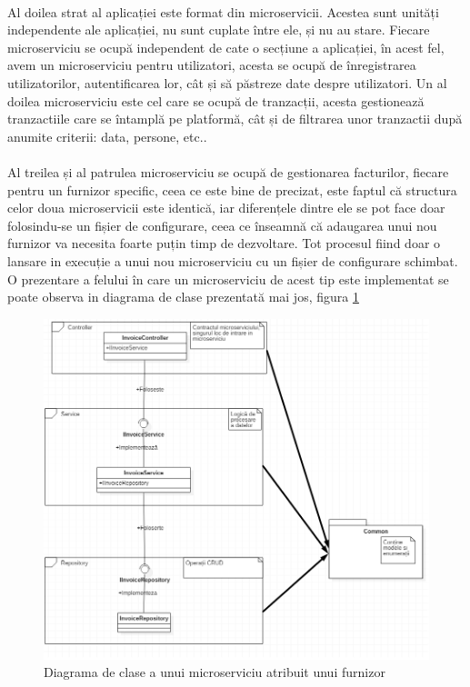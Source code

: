 \documentclass[12pt]{report}
\begin{document}
	\paragraph{}Al doilea strat al aplicației este format din microservicii. Acestea sunt unități independente ale aplicației, nu sunt cuplate între ele, și nu au stare. Fiecare microserviciu se ocupă independent de cate o secțiune a aplicației, în acest fel, avem un microserviciu pentru utilizatori, acesta se ocupă de înregistrarea utilizatorilor, autentificarea lor, cât și să păstreze date despre utilizatori. Un al doilea microserviciu este cel care se ocupă de tranzacții, acesta gestionează tranzactiile care se întamplă pe platformă, cât și de filtrarea unor tranzactii după anumite criterii: data, persone, etc.. 
	\paragraph{}Al treilea și al patrulea microserviciu se ocupă de gestionarea facturilor, fiecare pentru un furnizor specific, ceea ce este bine de precizat, este faptul că structura celor doua microservicii este identică, iar diferențele dintre ele se pot face doar folosindu-se un fișier de configurare, ceea ce înseamnă că adaugarea unui nou furnizor va necesita foarte puțin timp de dezvoltare. Tot procesul fiind doar o lansare in execuție a unui nou microserviciu cu un fișier de configurare schimbat. O prezentare a felului în care un microserviciu de acest tip este implementat se poate observa in diagrama de clase prezentată mai jos, figura \ref{classDiag} 
	\begin{figure}[h]
  	\centering
  	\includegraphics[scale=0.85]{classDiag}
	\caption{Diagrama de clase a unui microserviciu atribuit unui furnizor}  
	\label{classDiag}
  	\end{figure}
\end{document}

